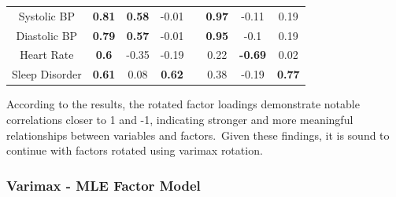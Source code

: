 \documentclass[11pt]{article}
\begin{document}
\begin{table}[h]
{\begin{tabular}{c|ccc|c|ccc|}
					\multicolumn{1}{|c|}{Systolic BP}       & \multicolumn{1}{c|}{\textbf{0.81}}     & \multicolumn{1}{c|}{\textbf{0.58}}     & -0.01            &  & \multicolumn{1}{c|}{\textbf{0.97}}    & \multicolumn{1}{c|}{-0.11}            & 0.19            \\ \cline{1-4} \cline{6-8} 
					\multicolumn{1}{|c|}{Diastolic BP}      & \multicolumn{1}{c|}{\textbf{0.79}}     & \multicolumn{1}{c|}{\textbf{0.57}}     & -0.01            &  & \multicolumn{1}{c|}{\textbf{0.95}}    & \multicolumn{1}{c|}{-0.1}             & 0.19            \\ \cline{1-4} \cline{6-8} 
					\multicolumn{1}{|c|}{Heart Rate}        & \multicolumn{1}{c|}{\textbf{0.6}}      & \multicolumn{1}{c|}{-0.35}             & -0.19            &  & \multicolumn{1}{c|}{0.22}             & \multicolumn{1}{c|}{\textbf{-0.69}}   & 0.02            \\ \cline{1-4} \cline{6-8} 
					\multicolumn{1}{|c|}{Sleep Disorder}    & \multicolumn{1}{c|}{\textbf{0.61}}     & \multicolumn{1}{c|}{0.08}              & \textbf{0.62}    &  & \multicolumn{1}{c|}{0.38}             & \multicolumn{1}{c|}{-0.19}            & \textbf{0.77}   \\ \cline{1-4} \cline{6-8} 
					\hline
				\end{tabular}%
			}
			\label{tab:rotated_unrotated}
		\end{table}
					
		According to the results, the rotated factor loadings demonstrate notable correlations closer to 1 and -1, indicating stronger and more meaningful relationships between variables and factors. Given these findings, it is sound to continue with factors rotated using varimax rotation. 
			
		\newpage
		\subsubsection{Varimax - MLE Factor Model}
		
\end{document}
